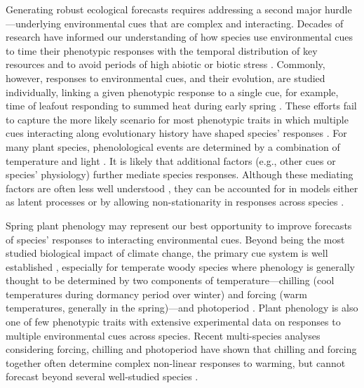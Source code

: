 \documentclass[11pt]{article}
\begin{document}
Generating robust ecological forecasts requires addressing a second major hurdle---underlying environmental cues that are complex and interacting. Decades of research have informed our understanding of how species use environmental cues to time their phenotypic responses with the temporal distribution of key resources and to avoid periods of high abiotic or biotic stress \citep{larcher1980,bonamour2019}. Commonly, however, responses to environmental cues, and their evolution, are studied individually, linking a given phenotypic response to a single cue, for example, time of leafout responding to summed heat during early spring \citep{davies2013phylogenetic}. These efforts fail to capture the more likely scenario for most phenotypic traits in which multiple cues interacting along evolutionary history have shaped species' responses \citep{Ackerly:2009ly}. For many plant species, phenolological events are determined by a combination of temperature and light \citep{chuinearees}. It is likely that additional factors (e.g., other cues or species' physiology) further mediate species responses. Although these mediating factors are often less well understood \citep{chuinearees}, they can be accounted for in models either as latent processes or by allowing non-stationarity in responses across species \citep{davies2019phylogenetically}.  

Spring plant phenology may represent our best opportunity to improve forecasts of species' responses to interacting environmental cues. Beyond being the most studied biological impact of climate change, the primary cue system is well established \citep{chuinearees}, especially for temperate woody species where phenology is generally thought to be determined by two components of temperature---chilling (cool temperatures during dormancy period over winter) and forcing (warm temperatures, generally in the spring)---and photoperiod \citep{ospreephoto}. Plant phenology is also one of few phenotypic traits with extensive experimental data on responses to multiple environmental cues across species. Recent multi-species analyses considering forcing, chilling and photoperiod have shown that chilling and forcing together often determine complex non-linear responses to warming, but cannot forecast beyond several well-studied species \citep{ettinger2020}. %
\end{document}
